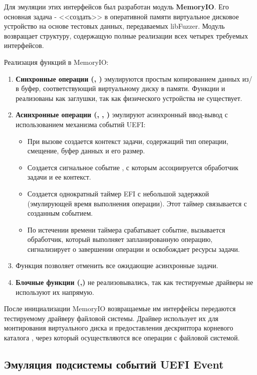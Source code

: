 Для эмуляции этих интерфейсов был разработан модуль\textbf{ MemoryIO}. Его основная задача  - <<создать>> в оперативной памяти виртуальное дисковое устройство на основе тестовых данных, передаваемых libFuzzer. Модуль возвращает структуру, содержащую полные реализации всех четырех требуемых интерфейсов.

Реализация функций в MemoryIO:
\begin{enumerate}
	\item \textbf{Синхронные операции (, ) }эмулируются простым копированием данных из/в буфер, соответствующий виртуальному диску в памяти. Функции  и  реализованы как заглушки, так как физического устройства не существует.
	\item \textbf{Асинхронные операции  (, , )}  эмулируют асинхронный ввод-вывод с использованием механизма событий UEFI:
	\begin{itemize}
		\item При вызове создается контекст задачи, содержащий тип операции, смещение, буфер данных и его размер.
		\item Создается  сигнальное событие , с которым ассоциируется обработчик задачи и ее контекст.
		\item Создается однократный таймер EFI с небольшой задержкой (эмулирующей время выполнения операции). Этот таймер связывается с созданным событием.
		\item По истечении времени таймера срабатывает событие, вызывается обработчик, который выполняет запланированную операцию, сигнализирует о завершении операции и освобождает ресурсы задачи.
	\end{itemize}
	\item Функция   позволяет отменить все ожидающие асинхронные задачи.
    \item \textbf{Блочные функции (,)} не реализовывались, так как тестируемые драйверы не используют их напрямую.
\end{enumerate}

После инициализации MemoryIO возвращаемые им интерфейсы передаются тестируемому драйверу файловой системы. Драйвер использует их для монтирования виртуального диска и предоставления дескриптора корневого каталога , через который осуществляются все операции с файловой системой.

\subsection{Эмуляция подсистемы событий UEFI Event}

